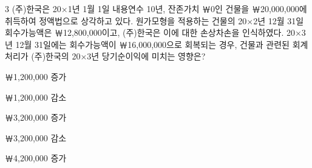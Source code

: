 \begin{question}{3}
(주)한국은 20×1년 1월 1일 내용연수 10년, 잔존가치 ￦0인 건물을 ￦20,000,000에 취득하여 정액법으로 상각하고 있다. 원가모형을 적용하는 건물의 20×2년 12월 31일 회수가능액은 ￦12,800,000이고, (주)한국은 이에 대한 손상차손을 인식하였다. 20×3년 12월 31일에는 회수가능액이 ￦16,000,000으로 회복되는 경우, 건물과 관련된 회계처리가 (주)한국의 20×3년 당기순이익에 미치는 영향은?
\begin{choices}
  \item ￦1,200,000 증가
  \item ￦1,200,000 감소
  \item ￦3,200,000 증가
  \item ￦3,200,000 감소
  \item ￦4,200,000 증가
\end{choices}
\end{question}
